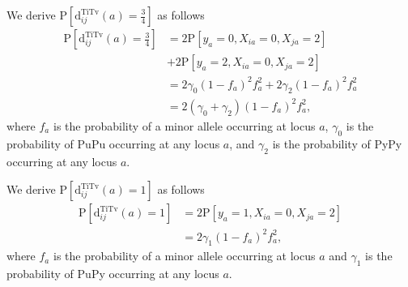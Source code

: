 \documentclass[aoas]{imsart}
\begin{document}
We derive $\text{P}\left[\text{d}^\text{TiTv}_{ij}(a) = \frac{3}{4}\right]$ as follows
%
\begin{equation}\label{eq:prob_TiTv_0.75}
\begin{aligned}
\text{P}\left[\text{d}^\text{TiTv}_{ij}(a) = \frac{3}{4}\right] &= 2 \text{P}\left[y_a = 0, X_{ia} = 0, X_{ja} = 2\right] \\
&+ 2 \text{P}\left[y_a = 2, X_{ia} = 0, X_{ja} = 2\right] \\
&= 2 \gamma_0 (1 - f_a)^2 f^2_a + 2 \gamma_2 (1 - f_a)^2 f^2_a \\
&= 2(\gamma_0 + \gamma_2)(1 - f_a)^2 f^2_a,
\end{aligned}
\end{equation}
%
where $f_a$ is the probability of a minor allele occurring at locus $a$, $\gamma_0$ is the probability of PuPu occurring at any locus $a$, and $\gamma_2$ is the probability of PyPy occurring at any locus $a$.

We derive $\text{P}\left[\text{d}^\text{TiTv}_{ij}(a) = 1\right]$ as follows
%
\begin{equation}\label{eq:prob_TiTv_1}
\begin{aligned}
\text{P}\left[\text{d}^\text{TiTv}_{ij}(a) = 1\right] &= 2 \text{P}\left[y_a = 1, X_{ia} = 0, X_{ja} = 2\right] \\
&= 2 \gamma_1 (1 - f_a)^2 f^2_a,
\end{aligned}
\end{equation}
%
where $f_a$ is the probability of a minor allele occurring at locus $a$ and $\gamma_1$ is the probability of PuPy occurring at any locus $a$.
\end{document}

